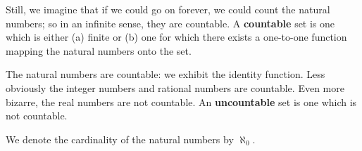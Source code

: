 Still, we imagine that if we could go on forever, we could count
the natural numbers; so in an infinite sense, they are countable.
A \textbf{countable} set is one which is either (a) finite or
(b) one for which there exists a one-to-one function mapping
the natural numbers onto the set.

The natural numbers are countable: we exhibit the identity function.
Less obviously the integer numbers and rational numbers are countable.
Even more bizarre, the real numbers are not countable.
An \textbf{uncountable} set is one which is not countable.


We denote the cardinality of the natural numbers by $\aleph_0$.

\strats
